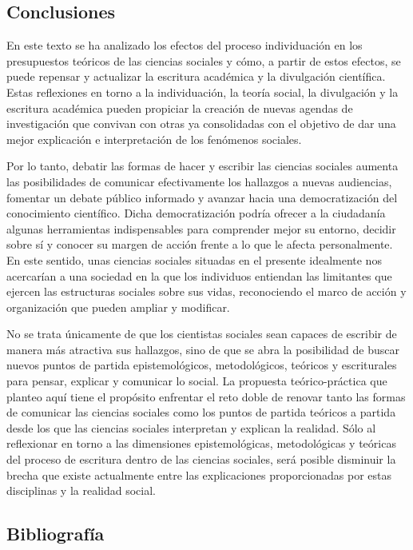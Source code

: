 \documentclass[
]{interact}
\begin{document}
\subsection{Conclusiones}\label{conclusiones}

En este texto se ha analizado los efectos del proceso individuación en
los presupuestos teóricos de las ciencias sociales y cómo, a partir de
estos efectos, se puede repensar y actualizar la escritura académica y
la divulgación científica. Estas reflexiones en torno a la
individuación, la teoría social, la divulgación y la escritura académica
pueden propiciar la creación de nuevas agendas de investigación que
convivan con otras ya consolidadas con el objetivo de dar una mejor
explicación e interpretación de los fenómenos sociales.

Por lo tanto, debatir las formas de hacer y escribir las ciencias
sociales aumenta las posibilidades de comunicar efectivamente los
hallazgos a nuevas audiencias, fomentar un debate público informado y
avanzar hacia una democratización del conocimiento científico. Dicha
democratización podría ofrecer a la ciudadanía algunas herramientas
indispensables para comprender mejor su entorno, decidir sobre sí y
conocer su margen de acción frente a lo que le afecta personalmente. En
este sentido, unas ciencias sociales situadas en el presente idealmente
nos acercarían a una sociedad en la que los individuos entiendan las
limitantes que ejercen las estructuras sociales sobre sus vidas,
reconociendo el marco de acción y organización que pueden ampliar y
modificar.

No se trata únicamente de que los cientistas sociales sean capaces de
escribir de manera más atractiva sus hallazgos, sino de que se abra la
posibilidad de buscar nuevos puntos de partida epistemológicos,
metodológicos, teóricos y escriturales para pensar, explicar y comunicar
lo social. La propuesta teórico-práctica que planteo aquí tiene el
propósito enfrentar el reto doble de renovar tanto las formas de
comunicar las ciencias sociales como los puntos de partida teóricos a
partida desde los que las ciencias sociales interpretan y explican la
realidad. Sólo al reflexionar en torno a las dimensiones
epistemológicas, metodológicas y teóricas del proceso de escritura
dentro de las ciencias sociales, será posible disminuir la brecha que
existe actualmente entre las explicaciones proporcionadas por estas
disciplinas y la realidad social.

\subsection*{Bibliografía}\label{bibliografuxeda}
\end{document}
